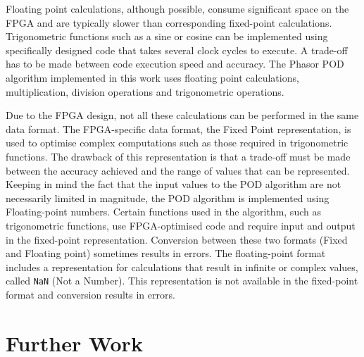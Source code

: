 \documentclass[journal]{IEEEtran}
\begin{document}
Floating point calculations, although possible, consume significant space on the FPGA and are typically slower than corresponding fixed-point calculations\cite{LabViewManuals}. Trigonometric functions such as a sine or cosine can be implemented using specifically designed code that takes several clock cycles to execute. A trade-off has to be made between code execution speed and accuracy. The Phasor POD algorithm implemented in this work uses floating point calculations, multiplication, division operations and  trigonometric operations.

Due to the FPGA design, not all these calculations can be performed in the same data format. The FPGA-specific data format, the Fixed Point representation, is used to optimise complex computations such as those required in trigonometric functions. The drawback of this representation is that a trade-off must be made between the accuracy achieved and the range of values that can be represented. Keeping in mind the fact that the input values to the POD algorithm are not necessarily limited in magnitude, the POD algorithm is implemented using Floating-point numbers. Certain functions used in the algorithm, such as trigonometric functions, use FPGA-optimised code and require input and output in the fixed-point representation. Conversion between these two formats (Fixed and Floating point) sometimes results in errors. The floating-point format includes a representation for calculations that result in infinite or complex values, called \texttt{NaN} (Not a Number)\cite{LabViewManuals}. This representation is not available in the fixed-point format and conversion results in errors.

\section{Further Work}\label{Future}
\end{document}
